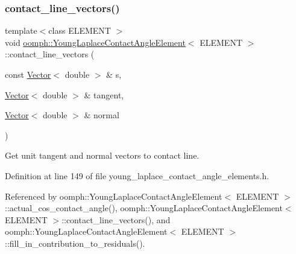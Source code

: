 \subsubsection{\texorpdfstring{contact\+\_\+line\+\_\+vectors()}{contact\_line\_vectors()}\hspace{0.1cm}{\footnotesize\ttfamily [1/3]}}
{\footnotesize\ttfamily template$<$class E\+L\+E\+M\+E\+NT $>$ \\
void \hyperlink{classoomph_1_1YoungLaplaceContactAngleElement}{oomph\+::\+Young\+Laplace\+Contact\+Angle\+Element}$<$ E\+L\+E\+M\+E\+NT $>$\+::contact\+\_\+line\+\_\+vectors (\begin{DoxyParamCaption}\item[{const \hyperlink{classoomph_1_1Vector}{Vector}$<$ double $>$ \&}]{s,  }\item[{\hyperlink{classoomph_1_1Vector}{Vector}$<$ double $>$ \&}]{tangent,  }\item[{\hyperlink{classoomph_1_1Vector}{Vector}$<$ double $>$ \&}]{normal }\end{DoxyParamCaption})\hspace{0.3cm}{\ttfamily [inline]}}



Get unit tangent and normal vectors to contact line. 



Definition at line 149 of file young\+\_\+laplace\+\_\+contact\+\_\+angle\+\_\+elements.\+h.



Referenced by oomph\+::\+Young\+Laplace\+Contact\+Angle\+Element$<$ E\+L\+E\+M\+E\+N\+T $>$\+::actual\+\_\+cos\+\_\+contact\+\_\+angle(), oomph\+::\+Young\+Laplace\+Contact\+Angle\+Element$<$ E\+L\+E\+M\+E\+N\+T $>$\+::contact\+\_\+line\+\_\+vectors(), and oomph\+::\+Young\+Laplace\+Contact\+Angle\+Element$<$ E\+L\+E\+M\+E\+N\+T $>$\+::fill\+\_\+in\+\_\+contribution\+\_\+to\+\_\+residuals().

\mbox{\label{classoomph_1_1YoungLaplaceContactAngleElement_ad0dfedac360bd5a6975a199f7dc3d8bd}} 
